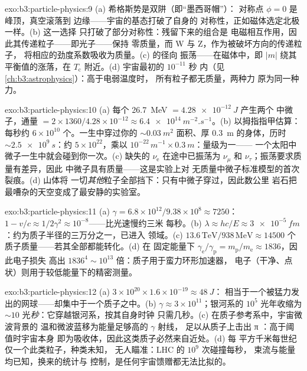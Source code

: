 \begin{solution}{exo:b3:particle-physics:9}
(a) 希格斯势是双阱（即“墨西哥帽”）：
对称点 $\phi = 0$ 是峰顶，真空滚落到
边缘——宇宙的基态打破了自身的
对称性，正如磁体选定北极一样。(b) 这一选择
只打破了部分对称性：残留下来的组合是
电磁相互作用，因此其传递粒子——即光子——保持
零质量，而 W 与 Z，作为被破坏方向的传递粒子，
将相应的劲度系数吸收为质量。(c) 的径向
振荡——在磁体中，即
$|m|$ 绕其平衡值的涨落，在
$T_{\text{c}}$ 附近。(d) 宇宙最初的 $10^{-11}$ 秒
内（见\cref{ch:b3:astrophysics}）：高于电弱温度时，
所有粒子都无质量，两种力
原为同一种力。
\end{solution}

\begin{solution}{exo:b3:particle-physics:10}
(a) 每个 \qty{26.7}{MeV} $= \qty{4.28e-12}{J}$ 产生两个
中微子，通量 $= 2\times1360/4.28\times10^{-12} \approx
\qty{6.4e14}{m^{-2}.s^{-1}}$。(b) 以拇指指甲估算：
每秒约 $6\times10^{10}$ 个。一生中穿过你的
${\sim}\qty{0.03}{m^2}$ 面积、厚 \qty{0.3}{m} 的身体，历时
${\sim}\qty{2.5e9}{s}$：约 $5\times10^{22}$，乘以
$10^{-22}\,\unit{m^{-1}}\times\qty{0.3}{m}$：量级为一——
一个太阳中微子一生中就会碰到你一次。(c)
缺失的 $\nu_{\text{e}}$ 在途中已振荡为 $\nu_\mu$ 和
$\nu_\tau$；振荡要求质量有差异，因此
中微子具有质量——这是实验上对
无质量中微子标准模型的首次裂痕。(d) 山体将
一切\emph{其他}粒子全部挡下：只有中微子穿过，因此数公里
岩石把最嘈杂的天空变成了最安静的实验室。
\end{solution}

\begin{solution}{exo:b3:particle-physics:11}
(a) $\gamma = 6.8\times10^{12}/9.38\times10^{8} \approx 7250$：
$1 - v/c \approx 1/2\gamma^2 \approx 10^{-8}$——比光速慢约三米
每秒。(b) $\lambda \approx hc/E \approx
\qty{3e-5}{fm}$：约为质子半径的三万分之一，已进入
领域。(c) $13.6\,\text{TeV}/938\,\text{MeV} \approx
14500$ 个质子质量——若其全部都能转化。(d) 在
固定能量下 $\gamma_{\text{e}}/\gamma_{\text{p}} =
m_{\text{p}}/m_{\text{e}} \approx 1836$，因此电子损失
高出 $1836^4 \sim 10^{13}$ 倍：质子用于蛮力环形加速器，
电子（干净、点状）则用于较低能量下的精密测量。
\end{solution}

\begin{solution}{exo:b3:particle-physics:12}
(a) $3\times10^{20}\times1.6\times10^{-19} \approx \qty{48}{J}$：
相当于一个被猛力发出的网球——却集中于一个质子之中。(b) $\gamma \approx
3\times10^{11}$；银河系的 $10^{5}$ 光年收缩为
${\sim}10$ 光\emph{秒}：它穿越银河系，按其自身时钟
只需几秒。(c) 在质子参考系中，宇宙微波背景的
温和微波蓝移为能量足够高的 $\gamma$ 射线，
足以从质子上击出 π ：高于阈值时宇宙本身
即为吸收体，因此这类质子必然来自近处。(d) 每
平方千米每世纪仅一个此类粒子，种类未知，
无人瞄准：LHC 的 $10^{9}$ 次碰撞每秒，
束流与能量均已知，换来的统计与
控制，是任何宇宙馈赠都无法比拟的。
\end{solution}

